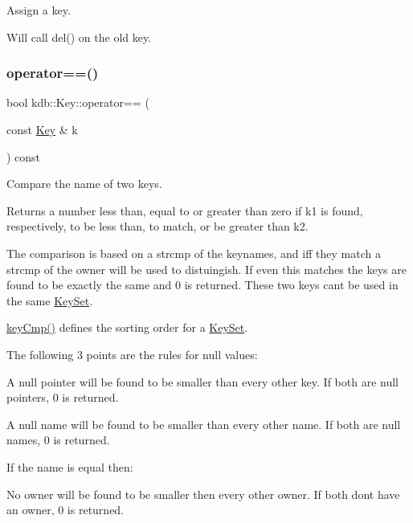 Assign a key. 

Will call del() on the old key. \mbox{\label{classkdb_1_1Key_ae52e7f4c4461db5356ddeef64a870cad}} 
\subsubsection{\texorpdfstring{operator==()}{operator==()}}
{\footnotesize\ttfamily bool kdb\+::\+Key\+::operator== (\begin{DoxyParamCaption}\item[{const \hyperlink{classkdb_1_1Key}{Key} \&}]{k }\end{DoxyParamCaption}) const\hspace{0.3cm}{\ttfamily [inline]}}



Compare the name of two keys. 

\begin{DoxyReturn}{Returns}
a number less than, equal to or greater than zero if k1 is found, respectively, to be less than, to match, or be greater than k2.
\end{DoxyReturn}
The comparison is based on a strcmp of the keynames, and iff they match a strcmp of the owner will be used to distuingish. If even this matches the keys are found to be exactly the same and 0 is returned. These two keys can\textquotesingle{}t be used in the same \hyperlink{classkdb_1_1KeySet}{Key\+Set}.

\hyperlink{group__keytest_gaf6e66e12fe04d535a5d1c8218ced803e}{key\+Cmp()} defines the sorting order for a \hyperlink{classkdb_1_1KeySet}{Key\+Set}.

The following 3 points are the rules for null values\+:


\begin{DoxyItemize}
\item A null pointer will be found to be smaller than every other key. If both are null pointers, 0 is returned.
\item A null name will be found to be smaller than every other name. If both are null names, 0 is returned.
\end{DoxyItemize}

If the name is equal then\+:


\begin{DoxyItemize}
\item No owner will be found to be smaller then every other owner. If both don\textquotesingle{}t have an owner, 0 is returned.
\end{DoxyItemize}

